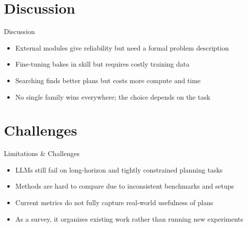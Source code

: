 \documentclass[10pt]{beamer}
\begin{document}
\section{Discussion}
\begin{frame}{Discussion}
\begin{itemize}
  \item External modules give reliability but need a formal problem description
  \item Fine-tuning bakes in skill but requires costly training data
  \item Searching finds better plans but costs more compute and time
  \item No single family wins everywhere; the choice depends on the task
\end{itemize}
\end{frame}
\section{Challenges}
\begin{frame}{Limitations \& Challenges}
\begin{itemize}
  \item LLMs still fail on long-horizon and tightly constrained planning tasks
  \item Methods are hard to compare due to inconsistent benchmarks and setups
  \item Current metrics do not fully capture real-world usefulness of plans
  \item As a survey, it organizes existing work rather than running new experiments
\end{itemize}
\end{frame}
\end{document}
